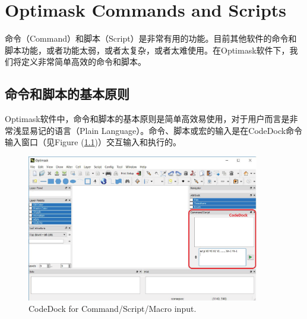 
\resetdatestamp %


\chapter{Optimask Commands and Scripts} \label{ChMaskCmdScript}

\pagestyle{fancy}
\fancyhead[RO,RE]{}
\fancyhead[LE]{\MakeUppercase{\leftmark}}
\fancyhead[LO]{\MakeUppercase{\rightmark}}
\fancyfoot[C]{\thepage}

命令（Command）和脚本（Script）是非常有用的功能。目前其他软件的命令和脚本功能，或者功能太弱，或者太复杂，或者太难使用。在Optimask软件下，我们将定义非常简单高效的命令和脚本。

\section{命令和脚本的基本原则} \label{SectCmdRule}
Optimask软件中，命令和脚本的基本原则是简单高效易使用，对于用户而言是非常浅显易记的语言（Plain Language）。命令、脚本或宏的输入是在CodeDock命令输入窗口（见Figure (\ref{FigCodeDock})）交互输入和执行的。

\begin{figure}[htb!p] %
	\centering
	\includegraphics[width=4in]{./Layout/FigsCmd/CodeDock.eps}
	\caption{CodeDock for Command/Script/Macro input.}
	\label{FigCodeDock}
\end{figure}


